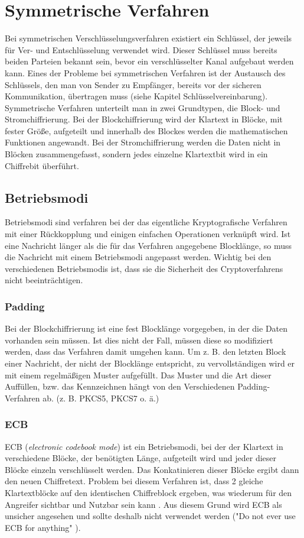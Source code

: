 \documentclass[10pt, a4paper,headsepline]{scrreprt}
\begin{document}
\section{Symmetrische Verfahren}
Bei symmetrischen Verschlüsselungsverfahren existiert ein Schlüssel, der jeweils für Ver- und Entschlüsselung verwendet wird. Dieser Schlüssel muss bereits beiden Parteien bekannt sein, bevor ein verschlüsselter Kanal aufgebaut werden kann. Eines der Probleme bei symmetrischen Verfahren ist der Austausch des Schlüssels, den man von Sender zu Empfänger, bereits vor der sicheren Kommunikation, übertragen muss (siehe Kapitel Schlüsselvereinbarung). Symmetrische Verfahren unterteilt man in zwei Grundtypen, die Block- und Stromchiffrierung. Bei der Blockchiffrierung wird der Klartext in Blöcke, mit fester Größe, aufgeteilt und innerhalb des Blockes werden die mathematischen Funktionen angewandt. Bei der Stromchiffrierung werden die Daten nicht in Blöcken zusammengefasst, sondern jedes einzelne Klartextbit wird in ein Chiffrebit überführt. \citep[S. 223]{book:angewandte-krypto}

\subsection{Betriebsmodi}
Betriebsmodi sind verfahren bei der das eigentliche Kryptografische Verfahren mit einer Rückkopplung und einigen einfachen Operationen verknüpft wird. Ist eine Nachricht länger als die für das Verfahren angegebene Blocklänge, so muss die Nachricht mit einem Betriebsmodi angepasst werden. Wichtig bei den verschiedenen Betriebsmodis ist, dass sie die Sicherheit des Cryptoverfahrens nicht beeinträchtigen.

\subsubsection{Padding}
Bei der Blockchiffrierung ist eine fest Blocklänge vorgegeben, in der die Daten vorhanden sein müssen. Ist dies nicht der Fall, müssen diese so modifiziert werden, dass das Verfahren damit umgehen kann.
Um z. B. den letzten Block einer Nachricht, der nicht der Blocklänge entspricht, zu vervollständigen wird er mit einem regelmäßigen Muster aufgefüllt. Das Muster und die Art dieser Auffüllen, bzw. das Kennzeichnen hängt von den Verschiedenen Padding-Verfahren ab. (z. B. PKCS5, PKCS7 o. ä.)

\subsubsection{ECB}
ECB (\textit{electronic codebook mode}) ist ein Betriebsmodi, bei der der Klartext in verschiedene Blöcke, der benötigten Länge, aufgeteilt wird und jeder dieser Blöcke einzeln verschlüsselt werden. Das Konkatinieren dieser Blöcke ergibt dann den neuen Chiffretext. Problem bei diesem Verfahren ist, dass 2 gleiche Klartextblöcke auf den identischen Chiffreblock ergeben, was wiederum für den Angreifer sichtbar und Nutzbar sein kann \citep[S. 223ff]{book:angewandte-krypto}. Aus diesem Grund wird ECB als unsicher angesehen und sollte deshalb nicht verwendet werden ("Do not ever use ECB for anything" \citep[S. 69]{book:practical-crypto}).
\end{document}

